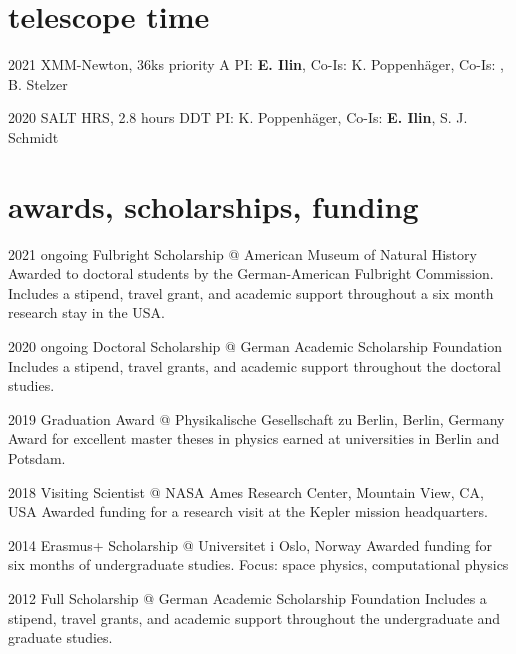 \documentclass[9.5pt]{k-cv} %
\begin{document}
\section{telescope time}

\begin{entrylist}

\entry
{2021}
{XMM-Newton, 36ks priority A}
{}
{PI: \textbf{E. Ilin}, Co-Is: K. Poppenh\"ager, Co-Is: , B. Stelzer}

\entry
{2020 }
{SALT HRS, 2.8 hours DDT}
{}
{PI: K. Poppenh\"ager, Co-Is: \textbf{E. Ilin}, S. J. Schmidt}




\end{entrylist}

\section{awards, scholarships, funding}

\begin{entrylist}
\entry
{2021 \to ongoing}
{Fulbright Scholarship @ American Museum of Natural History}
{ }
{Awarded to doctoral students by the German-American Fulbright Commission. Includes a stipend, travel grant, and academic support throughout a  six month research stay in the USA.}

\entry
{2020 \to ongoing}
{Doctoral Scholarship @ German Academic Scholarship Foundation}
{}
{Includes a stipend, travel grants, and academic support throughout the doctoral studies.}

\entry
{2019}
{Graduation Award @ Physikalische Gesellschaft zu Berlin, Berlin, Germany}
{}
{Award for excellent master theses in physics earned at universities in Berlin and Potsdam.}


\entry
{2018}
{Visiting Scientist @ NASA Ames Research Center, Mountain View, CA, USA}
{}
{Awarded funding for a research visit at the Kepler mission headquarters.}


\entry
{2014}
{Erasmus+ Scholarship @ Universitet i Oslo, Norway}
{}
{Awarded funding for six months of undergraduate studies.
Focus: space physics, computational physics}

\entry
{2012 }
{Full Scholarship @ German Academic Scholarship Foundation}
{}
{Includes a stipend, travel grants, and academic support throughout the undergraduate and graduate studies.}

\end{entrylist}
\end{document}
